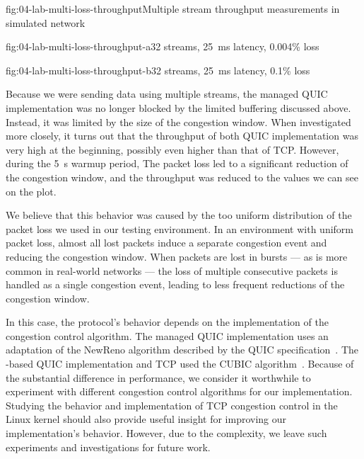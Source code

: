 \begin{myFigure}{fig:04-lab-multi-loss-throughput}{Multiple stream throughput measurements in simulated network}
\begin{mySubfigure}{0.49\linewidth}{fig:04-lab-multi-loss-throughput-a}{32 streams, \SI{25}{\milli\second} latency, 0.004\% loss}
\footnotesize

\end{mySubfigure}
\begin{mySubfigure}{0.49\linewidth}{fig:04-lab-multi-loss-throughput-b}{32 streams, \SI{25}{\milli\second} latency, 0.1\% loss}
\footnotesize

\end{mySubfigure}
\end{myFigure}

Because we were sending data using multiple streams, the managed QUIC implementation was no longer
blocked by the limited buffering discussed above. Instead, it was limited by the size of the
congestion window. When investigated more closely, it turns out that the throughput of both QUIC
implementation was very high at the beginning, possibly even higher than that of TCP\@. However,
during the \SI{5}{\second} warmup period, The packet loss led to a significant reduction of the
congestion window, and the throughput was reduced to the values we can see on the plot.

We believe that this behavior was caused by the too uniform distribution of the packet loss we used
in our testing environment. In an environment with uniform packet loss, almost all lost packets
induce a separate congestion event and reducing the congestion window. When packets are lost in
bursts --- as is more common in real-world networks --- the loss of multiple consecutive packets is
handled as a single congestion event, leading to less frequent reductions of the congestion window.

In this case, the protocol's behavior depends on the implementation of the congestion control
algorithm. The managed QUIC implementation uses an adaptation of the NewReno algorithm described by
the QUIC specification~\autocite[Section~7]{draft-ietf-quic-recovery}. The \libmsquic{}-based QUIC
implementation and TCP used the CUBIC algorithm~\cite{rfc8312}. Because of the substantial
difference in performance, we consider it worthwhile to experiment with different congestion control
algorithms for our implementation. Studying the behavior and implementation of TCP congestion
control in the Linux kernel should also provide useful insight for improving our implementation's
behavior. However, due to the complexity, we leave such experiments and investigations for future
work.

